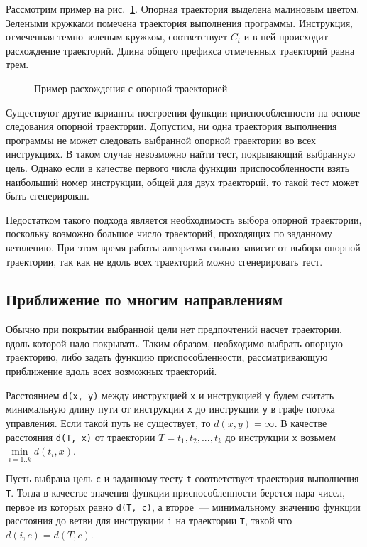 Рассмотрим пример на рис.~\ref{singlepathfitness}. Опорная траектория выделена малиновым цветом. Зелеными кружками помечена траектория выполнения программы. 
Инструкция, отмеченная темно-зеленым кружком, соответствует $C_t$ и в ней происходит расхождение траекторий. Длина общего префикса отмеченных траекторий 
равна трем.

\begin{figure}[h!]
  \caption{Пример расхождения с опорной траекторией}
  \label{singlepathfitness}
\end{figure}

Существуют другие варианты построения функции приспособленности на основе следования опорной траектории. Допустим, ни одна траектория выполнения программы не 
может следовать выбранной опорной траектории во всех инструкциях. В таком случае невозможно найти тест, покрывающий выбранную цель. Однако если в 
качестве первого числа функции приспособленности взять наибольший номер инструкции, общей для двух траекторий, то такой тест может быть сгенерирован.

Недостатком такого подхода является необходимость выбора опорной траектории, поскольку возможно большое число траекторий, проходящих по заданному ветвлению. 
При этом время работы алгоритма сильно зависит от выбора опорной траектории, так как не вдоль всех траекторий можно сгенерировать тест.

\subsection{Приближение по многим направлениям}
Обычно при покрытии выбранной цели нет предпочтений насчет траектории, вдоль которой надо покрывать. Таким образом, необходимо выбрать опорную траекторию, либо 
задать функцию приспособленности, рассматривающую приближение вдоль всех возможных траекторий.

Расстоянием \texttt{d(x, y)} между инструкцией \texttt{x} и инструкцией \texttt{y} будем считать минимальную длину пути от инструкции \texttt{x} до инструкции 
\texttt{y} в графе потока управления. Если такой путь не существует, то $d(x, y) = \infty$. В качестве расстояния \texttt{d(T, x)} от траектории $T={t_1, 
t_2,...,t_k}$ до инструкции \texttt{x} возьмем $\min\limits_{i=1..k}{d(t_i, x)}$.


Пусть выбрана цель \texttt{c} и заданному тесту \texttt{t} соответствует траектория выполнения \texttt{T}. Тогда в качестве значения функции приспособленности 
берется пара чисел, первое из которых равно \texttt{d(T, c)}, а второе~--- минимальному значению функции расстояния до ветви для инструкции \texttt{i} на 
траектории \texttt{T}, такой что $d(i,c) = d(T,c)$. 

